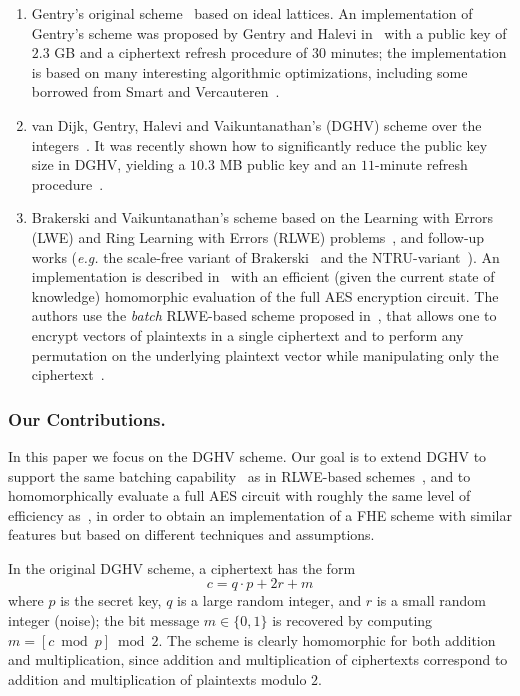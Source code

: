 \documentclass[11pt]{llncs}
\newcommand{\eg}{\textsl{e.g.}\xspace}
\begin{document}
\begin{enumerate}
\item Gentry's original scheme~\cite{GenPhD} based on ideal
  lattices.  An implementation of Gentry's scheme was proposed by
  Gentry and Halevi
  in~\cite{GH2011} with a public key of $2.3$ GB and a ciphertext
  refresh procedure of $30$ minutes; the implementation is based on
  many interesting algorithmic
  optimizations, including some borrowed from Smart and Vercauteren~\cite{SV2010}.

\smallskip

\item van Dijk, Gentry, Halevi and Vaikuntanathan's (DGHV) scheme over the
  integers~\cite{vDGHV2010}. It was recently shown how to significantly
  reduce the public key size in DGHV, yielding a $10.3$ MB public key and
  an $11$-minute refresh procedure~\cite{CNT2012}.

\smallskip

\item Brakerski and Vaikuntanathan's scheme based on the Learning with
  Errors (LWE) and Ring Learning with Errors (RLWE)
  problems~\cite{BV2011a,BV2011b}, and follow-up works (\eg the scale-free variant of Brakerski~\cite{Bra2012} and the NTRU-variant~\cite{LTV2012}). An implementation is described in~\cite{GHS2012c} with an 
  efficient (given the current state of knowledge)
  homomorphic evaluation of the full AES encryption circuit.  The
  authors use the \emph{batch} RLWE-based scheme proposed in~\cite{BGV2012,GHS2012a},
  that allows one to
 encrypt vectors of plaintexts in a single ciphertext and to
 perform any permutation on the underlying plaintext vector while
 manipulating only the ciphertext~\cite{SV2011}. 
\end{enumerate}

\subsubsection{Our Contributions.} 

In this paper we focus on the DGHV scheme. Our goal is to extend DGHV to
support the same batching capability~\cite{SV2011} as in RLWE-based
schemes~\cite{BV2011a,BV2011b}, and to homomorphically evaluate a full AES
circuit with roughly the same level of efficiency as~\cite{GHS2012c}, in
order to obtain an implementation of a FHE scheme with similar features
but based on different techniques and assumptions. 

In the original DGHV scheme, a ciphertext has the form
$$ c= q \cdot p + 2r+m$$
where $p$ is the secret key, $q$ is a large random integer, and $r$ is
a small random integer (noise); the bit message $m\in\{0,1\}$ is recovered by computing
$m=[c \bmod p]\bmod 2$.  The scheme is clearly homomorphic for both addition
and multiplication, since addition and multiplication of ciphertexts
correspond to addition and multiplication of plaintexts modulo
$2$. 
\end{document}
